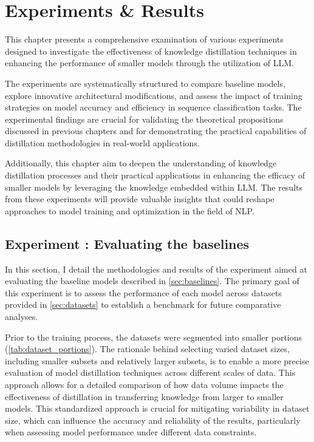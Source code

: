 \chapter{Experiments \& Results}
\label{chap:impl}

This chapter presents a comprehensive examination of various experiments designed to investigate the effectiveness of knowledge distillation techniques in enhancing the performance of smaller models through the utilization of LLM\@. 

The experiments are systematically structured to compare baseline models, explore innovative architectural modifications, and assess the impact of training strategies on model accuracy and efficiency in sequence classification tasks. The experimental findings are crucial for validating the theoretical propositions discussed in previous chapters and for demonstrating the practical capabilities of distillation methodologies in real-world applications.

Additionally, this chapter aim to deepen the understanding of knowledge distillation processes and their practical applications in enhancing the efficacy of smaller models by leveraging the knowledge embedded within LLM\@. The results from these experiments will provide valuable insights that could reshape approaches to model training and optimization in the field of NLP\@.

\section{Experiment \theexperiment: Evaluating the baselines}

In this section, I detail the methodologies and results of the experiment aimed at evaluating the baseline models described in \autoref{sec:baselines}. The primary goal of this experiment is to assess the performance of each model across datasets provided in \autoref{sec:datasets} to establish a benchmark for future comparative analyses.

Prior to the training process, the datasets were segmented into smaller portions (\autoref{tab:dataset_portions}). The rationale behind selecting varied dataset sizes, including smaller subsets and relatively larger subsets, is to enable a more precise evaluation of model distillation techniques across different scales of data. This approach allows for a detailed comparison of how data volume impacts the effectiveness of distillation in transferring knowledge from larger to smaller models. This standardized approach is crucial for mitigating variability in dataset size, which can influence the accuracy and reliability of the results, particularly when assessing model performance under different data constraints.

